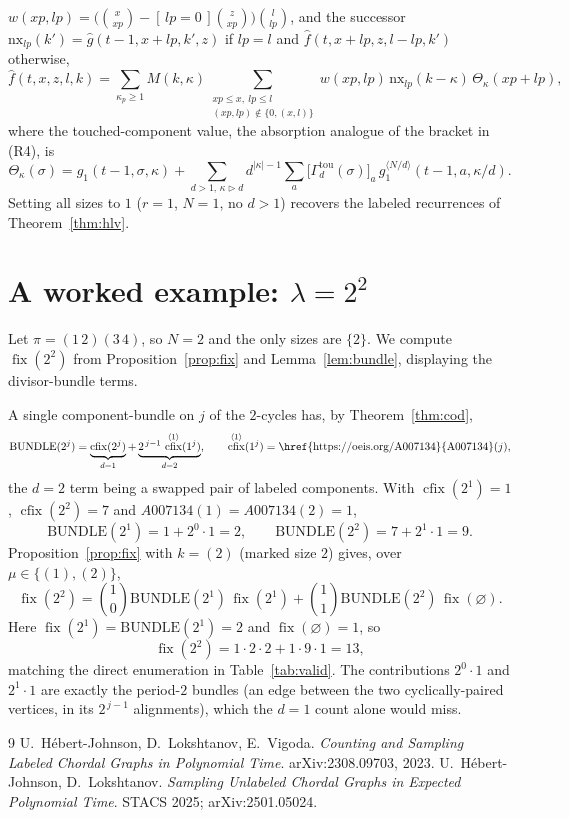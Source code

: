 \documentclass[11pt]{article}
\theoremstyle{plain}
\theoremstyle{definition}
\DeclareMathOperator{\fix}{fix}
\DeclareMathOperator{\cfix}{cfix}
\newcommand{\ghat}{\hat g}
\newcommand{\fhat}{\hat f}
\begin{document}
$w(xp,lp)=\big(\binom{x}{xp}-[\,lp{=}0\,]\binom{z}{xp}\big)\binom{l}{lp}$, and the successor
$\mathrm{nx}_{lp}(k')=\ghat(t{-}1,x{+}lp,k',z)$ if $lp=l$ and $\fhat(t,x{+}lp,z,l{-}lp,k')$
otherwise,
\begin{equation}\tag{R8}
\fhat(t,x,z,l,k)=\!\!\sum_{\kappa_p\ge1}\!\!M(k,\kappa)\!\!\sum_{\substack{xp\le x,\ lp\le l\\ (xp,lp)\notin\{0,(x,l)\}}}\!\!\!\! w(xp,lp)\,\mathrm{nx}_{lp}(k{-}\kappa)\,\Theta_\kappa(xp{+}lp),
\end{equation}
where the touched-component value, the absorption analogue of the bracket in (R4), is
\[
\Theta_\kappa(\sigma)=g_1(t{-}1,\sigma,\kappa)+\!\!\sum_{d>1,\,\kappa\rhd d}\!\! d^{|\kappa|-1}\sum_a\big[\Gamma^{\mathrm{tou}}_d(\sigma)\big]_a\,g_1^{\langle N/d\rangle}(t{-}1,a,\kappa/d).
\]
Setting all sizes to $1$ ($r=1$, $N=1$, no $d>1$) recovers the labeled recurrences of
Theorem~\ref{thm:hlv}.

\section{A worked example: $\lambda=2^2$}\label{app:ex}

Let $\pi=(1\,2)(3\,4)$, so $N=2$ and the only sizes are $\{2\}$. We compute $\fix(2^2)$ from
Proposition~\ref{prop:fix} and Lemma~\ref{lem:bundle}, displaying the divisor-bundle terms.

A single component-bundle on $j$ of the $2$-cycles has, by Theorem~\ref{thm:cod},
\[
\mathrm{BUNDLE}(2^j)=\underbrace{\cfix(2^j)}_{d=1}+\underbrace{2^{\,j-1}\,\cfix^{\langle1\rangle}(1^j)}_{d=2},
\qquad \cfix^{\langle1\rangle}(1^j)=\text{\href{https://oeis.org/A007134}{A007134}}(j),
\]
the $d=2$ term being a swapped pair of labeled components. With $\cfix(2^1)=1$,
$\cfix(2^2)=7$ and $A007134(1)=A007134(2)=1$,
\[
\mathrm{BUNDLE}(2^1)=1+2^{0}\!\cdot\!1=2,\qquad
\mathrm{BUNDLE}(2^2)=7+2^{1}\!\cdot\!1=9.
\]
Proposition~\ref{prop:fix} with $k=(2)$ (marked size $2$) gives, over $\mu\in\{(1),(2)\}$,
\[
\fix(2^2)=\binom{1}{0}\mathrm{BUNDLE}(2^1)\,\fix(2^1)+\binom{1}{1}\mathrm{BUNDLE}(2^2)\,\fix(\varnothing).
\]
Here $\fix(2^1)=\mathrm{BUNDLE}(2^1)=2$ and $\fix(\varnothing)=1$, so
\[
\fix(2^2)=1\cdot2\cdot2+1\cdot9\cdot1=13,
\]
matching the direct enumeration in Table~\ref{tab:valid}. The contributions $2^{0}\cdot1$ and
$2^{1}\cdot1$ are exactly the period-$2$ bundles (an edge between the two cyclically-paired vertices,
in its $2^{\,j-1}$ alignments), which the $d=1$ count alone would miss.

\begin{thebibliography}{9}
U.~H\'ebert-Johnson, D.~Lokshtanov, E.~Vigoda.
\emph{Counting and Sampling Labeled Chordal Graphs in Polynomial Time}.
arXiv:2308.09703, 2023.
U.~H\'ebert-Johnson, D.~Lokshtanov.
\emph{Sampling Unlabeled Chordal Graphs in Expected Polynomial Time}.
STACS 2025; arXiv:2501.05024.
\end{thebibliography}
\end{document}
